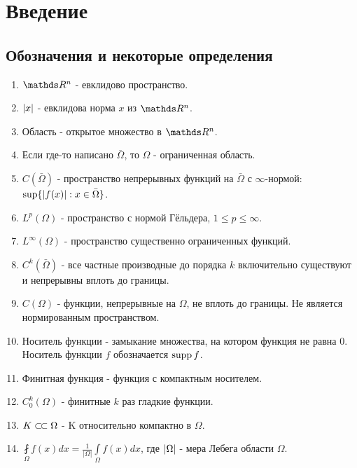 \chapter*{Введение}
\section*{Обозначения и некоторые определения}
\begin{enumerate}
\item $\real^n$ - евклидово пространство.
\item $\lvert x\rvert$ - евклидова норма $x$ из $\real^n$.
\item Область - открытое множество в $\real^n$.
\item Если где-то написано $\bar{\Omega}$, то $\Omega$ - ограниченная область.
\item $C(\bar{\Omega})$ - пространство непрерывных функций на $\bar{\Omega}$ с $\infty$-нормой: $\sup \{ \lvert f(x)\rvert : x \in \bar{\Omega} \}$.
\item $L^p (\Omega)$ - пространство с нормой Гёльдера, $1 \leq p \leq \infty$.
\item $L^\infty (\Omega)$ - пространство существенно ограниченных функций.
\item $C^k(\bar{\Omega})$ - все частные производные до порядка $k$ включительно существуют и непрерывны вплоть до границы.
\item $C(\Omega)$ - функции, непрерывные на $\Omega$, не вплоть до границы. Не является нормированным пространством.
\item Носитель функции - замыкание множества, на котором функция не равна $0$. Носитель функции $f$ обозначается $\operatorname{supp} f$.
\item Финитная функция - функция с компактным носителем.
\item $C^k_0(\Omega)$ - финитные $k$ раз гладкие функции.
\item $K \ssubset \Omega$ - K относительно компактно в $\Omega$.
\item $\displaystyle \fint \limits_{\Omega} f(x) dx = \frac{1}{|\Omega|} \int \limits_{\Omega} f(x) dx$, где $\lvert\Omega\rvert$ - мера Лебега области $\Omega$.
\end{enumerate}

